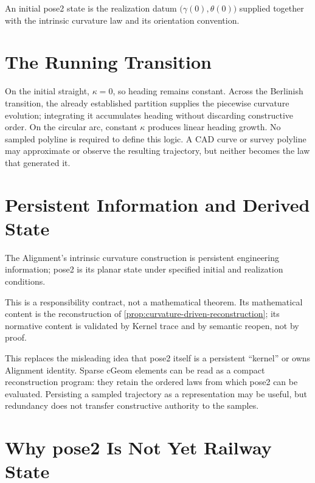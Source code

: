 \begin{definition}
\label{def:initial-pose2}
An initial pose2 state is the realization datum
\(\bigl(\gamma(0),\theta(0)\bigr)\) supplied together with the intrinsic
curvature law and its orientation convention.
\end{definition}

\section{The Running Transition}

On the initial straight, \(\kappa=0\), so heading remains constant. Across the
Berlinish transition, the already established partition supplies the
piecewise curvature evolution; integrating it accumulates heading without
discarding constructive order. On the circular arc, constant \(\kappa\)
produces linear heading growth. No sampled polyline is required to define this
logic. A CAD curve or survey polyline may approximate or observe the resulting
trajectory, but neither becomes the law that generated it.

\section{Persistent Information and Derived State}

\begin{principle}
\label{prop:pose2-persistent-kernel}
The Alignment's intrinsic curvature construction is persistent engineering
information; pose2 is its planar state under specified initial and realization
conditions.
\end{principle}

This is a responsibility contract, not a mathematical theorem. Its
mathematical content is the reconstruction of
\cref{prop:curvature-driven-reconstruction}; its normative content is
validated by Kernel trace and by semantic reopen, not by proof.

This replaces the misleading idea that pose2 itself is a persistent
``kernel'' or owns Alignment identity. Sparse \(\mathrm{cGeom}\) elements can
be read as a compact reconstruction program: they retain the ordered laws from
which pose2 can be evaluated. Persisting a sampled trajectory as a
representation may be useful, but redundancy does not transfer constructive
authority to the samples.

\section{Why pose2 Is Not Yet Railway State}

